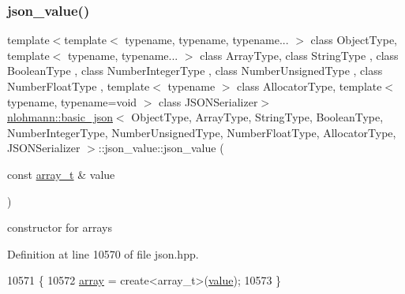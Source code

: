 \subsubsection{\texorpdfstring{json\+\_\+value()}{json\_value()}\hspace{0.1cm}{\footnotesize\ttfamily [11/12]}}
{\footnotesize\ttfamily template$<$template$<$ typename, typename, typename... $>$ class Object\+Type, template$<$ typename, typename... $>$ class Array\+Type, class String\+Type , class Boolean\+Type , class Number\+Integer\+Type , class Number\+Unsigned\+Type , class Number\+Float\+Type , template$<$ typename $>$ class Allocator\+Type, template$<$ typename, typename=void $>$ class J\+S\+O\+N\+Serializer$>$ \\
\hyperlink{classnlohmann_1_1basic__json}{nlohmann\+::basic\+\_\+json}$<$ Object\+Type, Array\+Type, String\+Type, Boolean\+Type, Number\+Integer\+Type, Number\+Unsigned\+Type, Number\+Float\+Type, Allocator\+Type, J\+S\+O\+N\+Serializer $>$\+::json\+\_\+value\+::json\+\_\+value (\begin{DoxyParamCaption}\item[{const \hyperlink{classnlohmann_1_1basic__json_ae095578e03df97c5b3991787f1056374}{array\+\_\+t} \&}]{value }\end{DoxyParamCaption})\hspace{0.3cm}{\ttfamily [inline]}}



constructor for arrays 



Definition at line 10570 of file json.\+hpp.


\begin{DoxyCode}
10571         \{
10572             \hyperlink{unionnlohmann_1_1basic__json_1_1json__value_a7947687f3ae1911d6e9847e2b3226157}{array} = create<array\_t>(\hyperlink{classnlohmann_1_1basic__json_adcf8ca5079f5db993820bf50036bf45d}{value});
10573         \}
\end{DoxyCode}
\mbox{\label{unionnlohmann_1_1basic__json_1_1json__value_a69cd49ed5ddf12af184de009c38e90b4}} 
